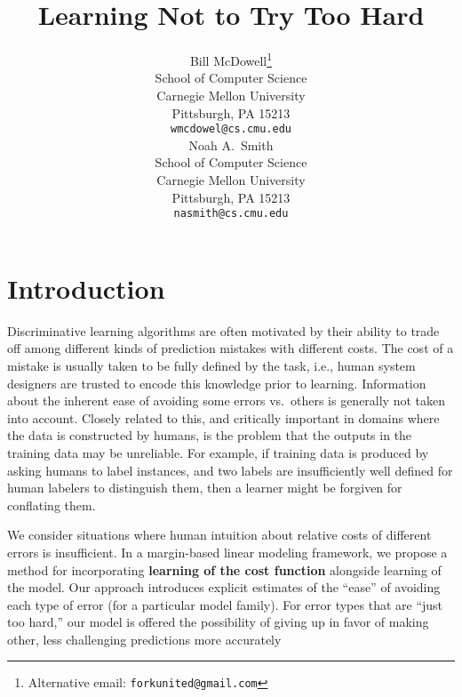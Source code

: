 \documentclass{article} %
\title{Learning Not to Try Too Hard}
\author{
Bill McDowell\thanks{Alternative email: \texttt{forkunited@gmail.com}} \\
School of Computer Science\\
Carnegie Mellon University\\
Pittsburgh, PA 15213 \\
\texttt{wmcdowel@cs.cmu.edu} \\
\And
Noah A.~Smith \\
School of Computer Science\\
Carnegie Mellon University\\
Pittsburgh, PA 15213 \\
\texttt{nasmith@cs.cmu.edu} \\
}
\newcommand{\bmcomment}[1]{\textcolor{blue}{\textsc{\textbf{[#1 --bm]}}}}
\newcommand{\nascomment}[1]{\textcolor{red}{\textsc{\textbf{[#1 --nas]}}}}
\begin{document}
\maketitle



\section{Introduction}

Discriminative learning algorithms are often motivated by their
ability to trade off among different kinds of prediction mistakes with
different costs.  The cost of a mistake is usually taken to be fully
defined by the task, i.e., human system designers are trusted to
encode this knowledge prior to learning.  Information about the
inherent ease of avoiding some errors vs.~others is generally not
taken into account.   Closely related to this, and critically
important in domains where the data is constructed by humans, is the
problem that the outputs in the training data may be unreliable.  For
example, if training data is produced by asking humans to label
instances, and two labels are insufficiently well defined for human
labelers to distinguish them,
then a learner might be forgiven for conflating them.

We consider situations where human intuition about relative costs of
different errors is insufficient.  In a margin-based linear modeling
framework, we propose a method for incorporating \textbf{learning of
  the cost function} alongside learning of the model.  Our approach
introduces explicit estimates of the ``ease'' of avoiding each type of
error
(for a particular model family).   For error types that are ``just too
hard,'' our model is offered the possibility of giving up in favor of
making other, less challenging predictions more accurately




\end{document}
